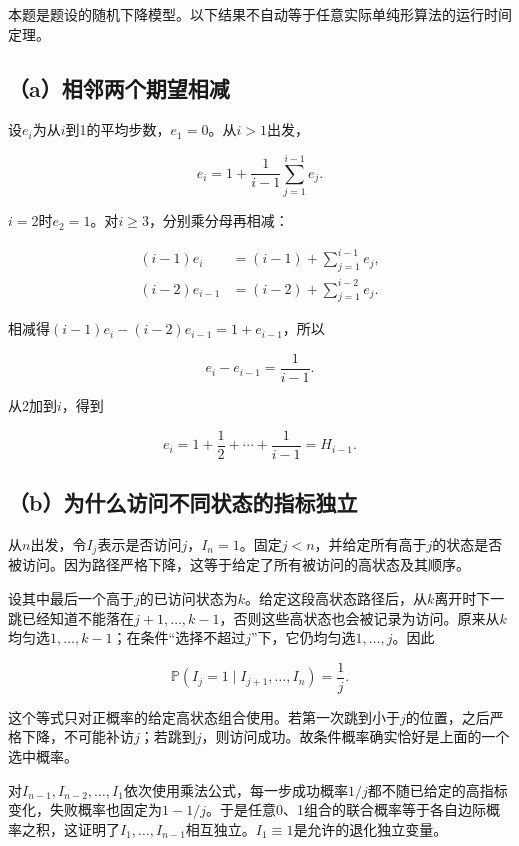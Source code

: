 \documentclass[
  11pt,a4paper,UTF8,fontset=fandol]{ctexart}
\begin{document}
本题是题设的随机下降模型。以下结果不自动等于任意实际单纯形算法的运行时间定理。

\subsection{（a）相邻两个期望相减}\label{aux76f8ux90bbux4e24ux4e2aux671fux671bux76f8ux51cf}

设\(e_i\)为从\(i\)到1的平均步数，\(e_1=0\)。从\(i>1\)出发，

\[e_i=1+\frac1{i-1}\sum_{j=1}^{i-1}e_j.\]

\(i=2\)时\(e_2=1\)。对\(i\ge3\)，分别乘分母再相减：

\[
\begin{aligned}
(i-1)e_i&=(i-1)+\sum_{j=1}^{i-1}e_j,\\
(i-2)e_{i-1}&=(i-2)+\sum_{j=1}^{i-2}e_j.
\end{aligned}
\]

相减得\((i-1)e_i-(i-2)e_{i-1}=1+e_{i-1}\)，所以

\[e_i-e_{i-1}=\frac1{i-1}.\]

从2加到\(i\)，得到

\[\boxed{e_i=1+\frac12+\cdots+\frac1{i-1}=H_{i-1}.}\]

\subsection{（b）为什么访问不同状态的指标独立}\label{bux4e3aux4ec0ux4e48ux8bbfux95eeux4e0dux540cux72b6ux6001ux7684ux6307ux6807ux72ecux7acb}

从\(n\)出发，令\(I_j\)表示是否访问\(j\)，\(I_n=1\)。固定\(j<n\)，并给定所有高于\(j\)的状态是否被访问。因为路径严格下降，这等于给定了所有被访问的高状态及其顺序。

设其中最后一个高于\(j\)的已访问状态为\(k\)。给定这段高状态路径后，从\(k\)离开时下一跳已经知道不能落在\(j+1,\ldots,k-1\)，否则这些高状态也会被记录为访问。原来从\(k\)均匀选\(1,\ldots,k-1\)；在条件``选择不超过\(j\)''下，它仍均匀选\(1,\ldots,j\)。因此

\[\boxed{\mathbb P(I_j=1\mid I_{j+1},\ldots,I_n)=\frac1j.}\]

这个等式只对正概率的给定高状态组合使用。若第一次跳到小于\(j\)的位置，之后严格下降，不可能补访\(j\)；若跳到\(j\)，则访问成功。故条件概率确实恰好是上面的一个选中概率。

对\(I_{n-1},I_{n-2},\ldots,I_1\)依次使用乘法公式，每一步成功概率\(1/j\)都不随已给定的高指标变化，失败概率也固定为\(1-1/j\)。于是任意0、1组合的联合概率等于各自边际概率之积，这证明了\(I_1,\ldots,I_{n-1}\)相互独立。\(I_1\equiv1\)是允许的退化独立变量。
\end{document}
